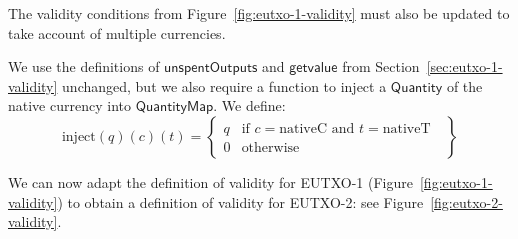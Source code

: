 \documentclass[a4paper]{article}
\newcommand{\s}{\textsf}  %
\newcommand{\msf}[1]{\ensuremath{\mathsf{#1}}}
\newcommand{\getvalue}{\msf{getvalue}}
\newcommand{\unspent}{\msf{unspentOutputs}}
\newcommand{\qty}{\ensuremath{\s{Quantity}}}
\newcommand{\nativeCur}{\ensuremath{\mathrm{nativeC}}}
\newcommand{\nativeTok}{\ensuremath{\mathrm{nativeT}}}
\newcommand{\injectNative}{\ensuremath{\mathrm{inject}}}
\newcommand{\qtymap}{\ensuremath{\s{QuantityMap}}}
\begin{document}
\bigskip
\noindent The validity conditions from
Figure~\ref{fig:eutxo-1-validity} must also be updated to take account
of multiple currencies.

We use the definitions of \unspent{}  and
\getvalue{} from Section~\ref{sec:eutxo-1-validity} unchanged,
but we also require a function to inject a \qty{} of the native currency
into \qtymap{}. We define:
\begin{displaymath}
  \injectNative(q)(c)(t) = \left\{
    \begin{array}{ll}
      q & \mbox{if $c = \nativeCur$ and $t = \nativeTok$ }\\
      0 & \mbox{otherwise}
    \end{array}
  \right\}
\end{displaymath}

We can now adapt the definition of validity for EUTXO-1
(Figure~\ref{fig:eutxo-1-validity}) to obtain a definition of validity for
EUTXO-2: see Figure~\ref{fig:eutxo-2-validity}.
\end{document}
